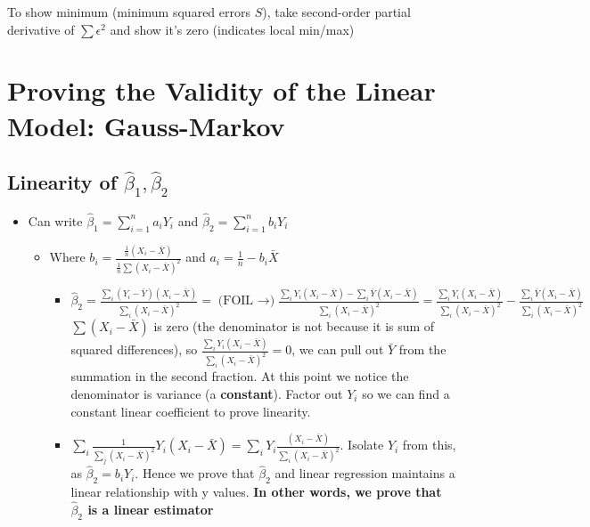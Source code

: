\documentclass[10pt, oneside]{article}
\begin{document}
To show minimum (minimum squared errors $S$), take second-order partial derivative of $\sum \epsilon^2$ and show it's zero (indicates local min/max)

\section{Proving the Validity of the Linear Model: Gauss-Markov}

\subsection{Linearity of $\hat \beta_1, \hat \beta_2$}
\begin{itemize}
    \item Can write $\hat \beta_1=\sum_{i=1} ^n a_i Y_i$ and $\hat \beta_2 =\sum_{i=1} ^n b_iY_i$
    \begin{itemize}
        \item Where $b_i = \frac{\frac{1}{n} (X_i-\bar X)}{\frac{1}{n} \sum(X_i-\bar X)^2}$ and $a_i = \frac{1}{n} - b_i \bar X$
        \begin{itemize}
            \item $\hat \beta_2 = \frac{\sum_i (Y_i -\bar Y) (X_i -\bar X)}{\sum_i (X_i -\bar X)^2}=\text{(FOIL $\rightarrow$)} \frac{\sum_i Y_i (X_i -\bar X)-\sum_i \bar Y (X_i -\bar X)}{\sum_i (X_i -\bar X)^2}=\frac{\sum_i Y_i (X_i-\bar X)}{\sum _i (X_i - \bar X)^2} - \frac{\sum_i \bar Y (X_i-\bar X)}{\sum _i (X_i - \bar X)^2}$ \\
            $\sum(X_i -\bar X)$ is zero (the denominator is not because it is sum of squared differences), so $\frac{\sum_i Y_i (X_i-\bar X)}{\sum _i (X_i - \bar X)^2} = 0$, we can pull out $\bar Y$ from the summation in the second fraction. At this point we notice the denominator is variance (a \textbf{constant}). Factor out $Y_i$ so we can find a constant linear coefficient to prove linearity.
            \item $\sum_i \frac{1}{\sum_j (X_i - \bar X)^2} Y_i (X_i -\bar X) =\sum_i Y_i \frac{(X_i -\bar X)}{\sum_i (X_i -\bar X)^2}$. Isolate $Y_i$ from this, as $\hat \beta_2 = b_i Y_i$. Hence we prove that $\hat \beta_2$ and linear regression maintains a linear relationship with y values. \textbf{In other words, we prove that $\hat \beta_2$ is a linear estimator}
        \end{itemize}
    \end{itemize}
\end{itemize}
\end{document}
